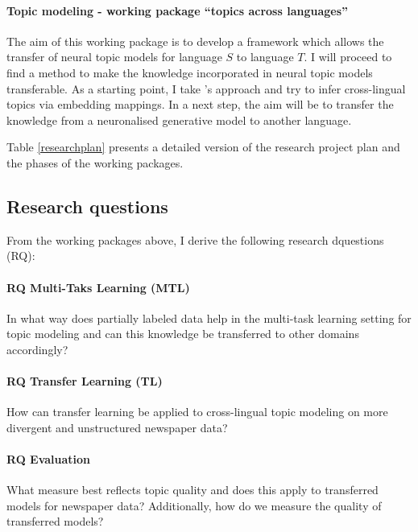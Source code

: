 \paragraph{Topic modeling - working package ``topics across languages''} The aim of this working package is to develop a framework which allows the transfer of neural topic models for language $S$ to language $T$. I will proceed to find a method to make the knowledge incorporated in neural topic models transferable. As a starting point, I take \citet{Moody16}'s approach and try to infer cross-lingual topics via embedding mappings. In a next step, the aim will be to transfer the knowledge from a neuronalised generative model to another language.

Table \ref{researchplan} presents a detailed version of the research project plan and the phases of the working packages.

\subsection{Research questions}
From the working packages above, I derive the following research dquestions (RQ):

\paragraph{RQ Multi-Taks Learning (MTL)} In what way does partially labeled data help in the multi-task learning setting for topic modeling and can this knowledge be transferred  to other domains accordingly?

\paragraph{RQ Transfer Learning (TL)} How can transfer learning be applied to cross-lingual topic modeling on more divergent and unstructured newspaper data?

\paragraph{RQ Evaluation} What measure best reflects topic quality and does this apply to transferred models for newspaper data? Additionally, how do we measure the quality of transferred models?

